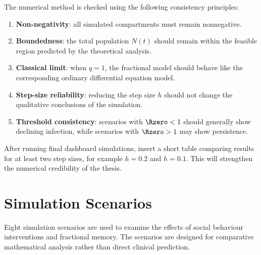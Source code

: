 The numerical method is checked using the following consistency principles:
\begin{enumerate}
  \item \textbf{Non-negativity}: all simulated compartments must remain nonnegative.
  \item \textbf{Boundedness}: the total population $N(t)$ should remain within the feasible region predicted by the theoretical analysis.
  \item \textbf{Classical limit}: when $q=1$, the fractional model should behave like the corresponding ordinary differential equation model.
  \item \textbf{Step-size reliability}: reducing the step size $h$ should not change the qualitative conclusions of the simulation.
  \item \textbf{Threshold consistency}: scenarios with $\Rzero<1$ should generally show declining infection, while scenarios with $\Rzero>1$ may show persistence.
\end{enumerate}

\begin{remarkbox}[title={Part to fill after simulation}]
After running final dashboard simulations, insert a short table comparing results for at least two step sizes, for example $h=0.2$ and $h=0.1$. This will strengthen the numerical credibility of the thesis.
\end{remarkbox}

\section{Simulation Scenarios}

Eight simulation scenarios are used to examine the effects of social behaviour interventions and fractional memory. The scenarios are designed for comparative mathematical analysis rather than direct clinical prediction.

